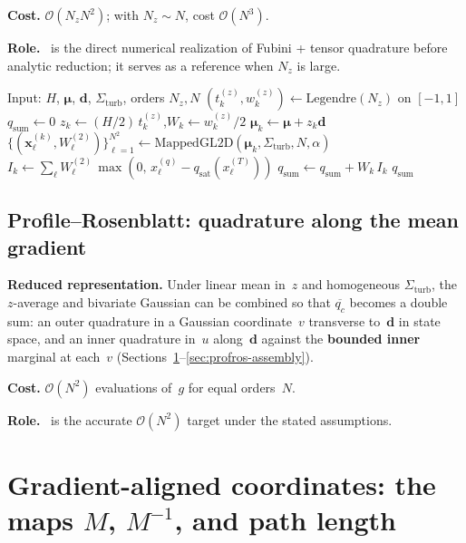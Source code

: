 \documentclass[11pt,a4paper]{article}
\begin{document}
\textbf{Cost.} $\mathcal{O}(N_z N^2)$; with $N_z\sim N$, cost $\mathcal{O}(N^3)$.

\textbf{Role.}
\columntensor\ is the direct numerical realization of Fubini + tensor quadrature before analytic reduction; it serves as a reference when $N_z$ is large.

\begin{algorithm}[H]
\caption{Column-tensor (tensor-$z$) estimate of $\overline{q_c}$}
\label{alg:columntensor}
\begin{algorithmic}[1]
\STATE Input: $H$, $\boldsymbol{\mu}$, $\mathbf{d}$, $\Sigma_{\mathrm{turb}}$, orders $N_z,N$
\STATE $(t^{(z)}_k,w^{(z)}_k)\gets \mathrm{Legendre}(N_z)$ on $[-1,1]$
\STATE $q_{\mathrm{sum}}\gets 0$
  \STATE $z_k \gets (H/2)\,t^{(z)}_k$,\quad $W_k\gets w^{(z)}_k/2$
  \STATE $\boldsymbol{\mu}_k \gets \boldsymbol{\mu} + z_k\mathbf{d}$
  \STATE $\{(\mathbf{x}^{(k)}_\ell, W^{(2)}_\ell)\}_{\ell=1}^{N^2} \gets \mathrm{MappedGL2D}(\boldsymbol{\mu}_k,\Sigma_{\mathrm{turb}},N,\alpha)$
  \STATE $I_k \gets \sum_{\ell} W^{(2)}_\ell\,\max(0,\,x^{(q)}_{\ell}-q_{\mathrm{sat}}(x^{(T)}_{\ell}))$
  \STATE $q_{\mathrm{sum}} \gets q_{\mathrm{sum}} + W_k\,I_k$
\ENDFOR
\STATE \RETURN $q_{\mathrm{sum}}$
\end{algorithmic}
\end{algorithm}

\subsection{Profile--Rosenblatt: quadrature along the mean gradient}
\textbf{Reduced representation.}
Under linear mean in~$z$ and homogeneous $\Sigma_{\mathrm{turb}}$, the $z$-average and bivariate Gaussian can be combined so that $\overline{q_c}$ becomes a double sum: an outer quadrature in a Gaussian coordinate~$v$ transverse to~$\mathbf{d}$ in state space, and an inner quadrature in~$u$ along~$\mathbf{d}$ against the \textbf{bounded inner} marginal at each~$v$ (Sections~\ref{sec:grad-align-coords}--\ref{sec:profros-assembly}).

\textbf{Cost.} $\mathcal{O}(N^2)$ evaluations of~$g$ for equal orders~$N$.

\textbf{Role.}
\profileros\ is the accurate $\mathcal{O}(N^2)$ target under the stated assumptions.

\section{\texorpdfstring{Gradient-aligned coordinates: the maps $M$, $M^{-1}$, and path length}{Gradient-aligned coordinates and path length}}
\label{sec:grad-align-coords}
\end{document}

